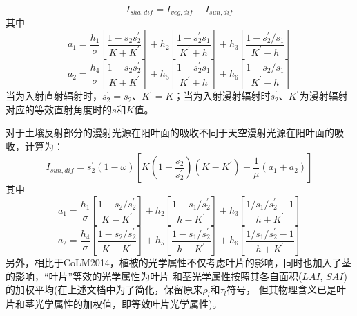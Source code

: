 \begin{equation}
I_{sha,dif}=I_{veg,dif}-I_{sun,dif}
\end{equation}
其中
\begin{equation}
a_{1}=\frac{h_{1}}{\sigma}\left[\frac{1-s_{2} s_{2}^{\prime}}{K+K^{\prime}}\right]+h_{2}\left[\frac{1-s_{2}^{\prime} 
s_{1}}{K^{\prime}+h}\right]+h_{3}\left[\frac{1-s_{2}^{\prime} / s_{1}}{K^{\prime}-h}\right]
\end{equation}
\begin{equation}
a_{2}=\frac{h_{4}}{\sigma}\left[\frac{1-s_{2} s_{2}^{\prime}}{K+K^{\prime}}\right]+h_{5}\left[\frac{1-s_{2}^{\prime} s_{1}}
{K^{\prime}+h}\right]+h_{6}\left[\frac{1-s_{2} / s_{1}}{K^{\prime}-h}\right]
\end{equation}
当为入射直射辐射时，$s_2^\prime=s_2$、$K^\prime=K$；当为入射漫射辐射时$s_2^\prime$、$K^\prime$为漫射辐射对应的等效直射角度时的$s$和$K$值。


对于土壤反射部分的漫射光源在阳叶面的吸收不同于天空漫射光源在阳叶面的吸收，计算为：
\begin{equation}
I_{s u n, dif}=s_{2}^{\prime}(1-\omega)\left[K\left(1-\frac{s_{2}}{s_{2}^{\prime}}\right)
\left(K-K^{\prime}\right)+\frac{1}{\bar{\mu}}\left(a_{1}+a_{2}\right)\right]
\end{equation}
其中
\begin{equation}
a_{1}=\frac{h_{1}}{\sigma}\left[\frac{1-s_{2} / s_{2}^{\prime}}{K-K^{\prime}}\right]+h_{2}\left[\frac{1-s_{1} /
 s_{2}^{\prime}}{h-K^{\prime}}\right]+h_{3}\left[\frac{1 / s_{1} / s_{2}^{\prime}-1}{h+K^{\prime}}\right]
\end{equation}
\begin{equation}
a_{2}=\frac{h_{4}}{\sigma}\left[\frac{1-s_{2} / s_{2}^{\prime}}{K-K^{\prime}}\right]+h_{5}\left[\frac{1-s_{1} / 
s_{2}^{\prime}}{h-K^{\prime}}\right]+h_{6}\left[\frac{1 / s_{1} / s_{2}^{\prime}-1}{h+K^{\prime}}\right]
\end{equation}
另外，相比于CoLM2014，植被的光学属性不仅考虑叶片的影响，同时也加入了茎的影响，“叶片”等效的光学属性为叶片
和茎光学属性按照其各自面积($LAI$, $SAI$)的加权平均(在上述文档中为了简化，保留原来$\rho_l$和$\tau_l$符号，
但其物理含义已是叶片和茎光学属性的加权值，即等效叶片光学属性)。



